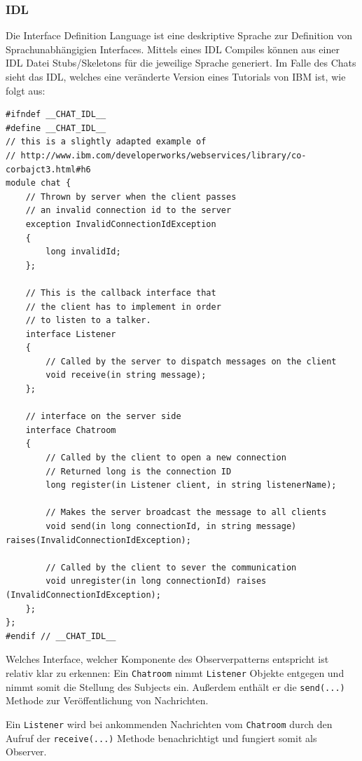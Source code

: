 \subsubsection{IDL}
Die Interface Definition Language ist eine deskriptive Sprache zur Definition von Sprachunabh\"angigien Interfaces.
Mittels eines IDL Compiles k\"onnen aus einer IDL Datei Stubs/Skeletons f\"ur die jeweilige Sprache generiert.
Im Falle des Chats sieht das IDL, welches eine ver\"anderte Version eines Tutorials von IBM\cite{idl-callback} ist, wie folgt aus:

\begin{lstlisting}[language={[CORBA]IDL}, caption=chat.idl]
#ifndef __CHAT_IDL__
#define __CHAT_IDL__
// this is a slightly adapted example of
// http://www.ibm.com/developerworks/webservices/library/co-corbajct3.html#h6
module chat {
    // Thrown by server when the client passes
    // an invalid connection id to the server
    exception InvalidConnectionIdException
    {
        long invalidId;
    };

    // This is the callback interface that
    // the client has to implement in order
    // to listen to a talker.
    interface Listener
    {
        // Called by the server to dispatch messages on the client
        void receive(in string message);
    };

    // interface on the server side
    interface Chatroom
    {
        // Called by the client to open a new connection
        // Returned long is the connection ID
        long register(in Listener client, in string listenerName);

        // Makes the server broadcast the message to all clients
        void send(in long connectionId, in string message) raises(InvalidConnectionIdException);

        // Called by the client to sever the communication
        void unregister(in long connectionId) raises (InvalidConnectionIdException);
    };
};
#endif // __CHAT_IDL__
\end{lstlisting}

Welches Interface, welcher Komponente des Observerpatterns entspricht ist relativ klar zu erkennen:
Ein \texttt{Chatroom} nimmt \texttt{Listener} Objekte entgegen und nimmt somit die Stellung des Subjects ein.
Au\ss erdem enth\"alt er die \texttt{send(...)} Methode zur Ver\"offentlichung von Nachrichten.

Ein \texttt{Listener} wird bei ankommenden Nachrichten vom \texttt{Chatroom} durch den Aufruf der \texttt{receive(...)} Methode benachrichtigt und fungiert somit als Observer.

